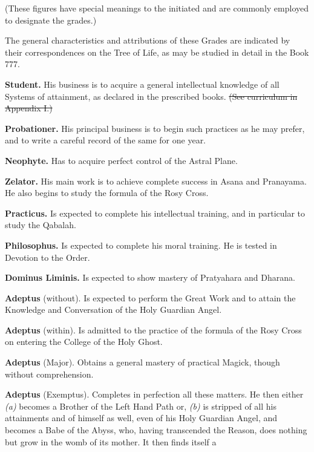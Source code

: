 (These figures have special meanings to the initiated and are commonly employed to designate the grades.)

The general characteristics and attributions of these Grades are indicated by their correspondences on the Tree of Life, as may be studied in detail in the Book 777.

\textbf{Student.} \textemdash{} His business is to acquire a general intellectual knowledge of all Systems of attainment, as declared in the prescribed books. \sout{(See curriculum in Appendix I.)}

\textbf{Probationer.} \textemdash{} His principal business is to begin such practices as he may prefer, and to write a careful record of the same for one year.

\textbf{Neophyte.} \textemdash{} Has to acquire perfect control of the Astral Plane.

\textbf{Zelator.} \textemdash{} His main work is to achieve complete success in Asana and Pranayama. He also begins to study the formula of the Rosy Cross.

\textbf{Practicus.} \textemdash{} Is expected to complete his intellectual training, and in particular to study the Qabalah.

\textbf{Philosophus.} \textemdash{} Is expected to complete his moral training. He is tested in Devotion to the Order.

\textbf{Dominus Liminis.} \textemdash{} Is expected to show mastery of Pratyahara and Dharana.

\textbf{Adeptus} (without). \textemdash{} Is expected to perform the Great Work and to attain the Knowledge and Conversation of the Holy Guardian Angel.

\textbf{Adeptus} (within). \textemdash{} Is admitted to the practice of the formula of the Rosy Cross on entering the College of the Holy Ghost.

\textbf{Adeptus} (Major). \textemdash{} Obtains a general mastery of practical Magick, though without comprehension.

\textbf{Adeptus} (Exemptus). \textemdash{} Completes in perfection all these matters. He then either \textit{(a)} becomes a Brother of the Left Hand Path or, \textit{(b)}  is stripped of all his attainments and of himself as well, even of his Holy Guardian Angel, and becomes a Babe of the Abyss, who, having transcended the Reason, does nothing but grow in the womb of its mother. It then finds itself a

